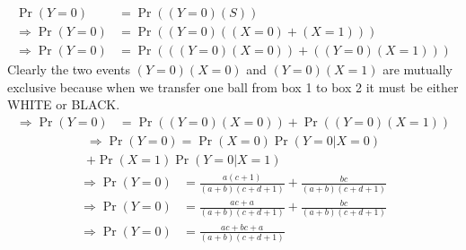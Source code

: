 \documentclass[journal,twocolumn]{IEEEtran}
\providecommand{\pr}[1]{\ensuremath{\Pr\left(#1\right)}}
\begin{document}
\begin{align}
    \pr{Y=0} &= \pr{(Y=0)(S)} \\
   \Rightarrow \pr{Y=0} &= \pr{(Y=0)((X=0)+(X=1))} \\
    \Rightarrow \pr{Y=0} &= \pr{((Y=0)(X=0)) + ((Y=0)(X=1))} 
\end{align}
Clearly the two events $(Y=0)(X=0)$ and $(Y=0)(X=1)$ are mutually exclusive because when we transfer one ball from box 1 to box 2 it must be either WHITE or BLACK.\\
\begin{align}
    \Rightarrow \pr{Y=0} &= \pr{(Y=0)(X=0)} + \pr{(Y=0)(X=1)}
    \end{align}
    \begin{multline}
    \Rightarrow \pr{Y=0} = \pr{X=0} \pr{Y=0|X=0} \\ +\pr{X=1}\pr{Y=0|X=1} 
    \end{multline}
    \begin{align}
    \Rightarrow \pr{Y=0} &= \frac{a(c+1)}{(a+b)(c+d+1)} + \frac{bc}{(a+b)(c+d+1)} \\
    \Rightarrow \pr{Y=0} &= \frac{ac+a}{(a+b)(c+d+1)} + \frac{bc}{(a+b)(c+d+1)} \\
    \Rightarrow \pr{Y=0} &= \frac{ac+bc+a}{(a+b)(c+d+1)}
\end{align}
\end{document}
